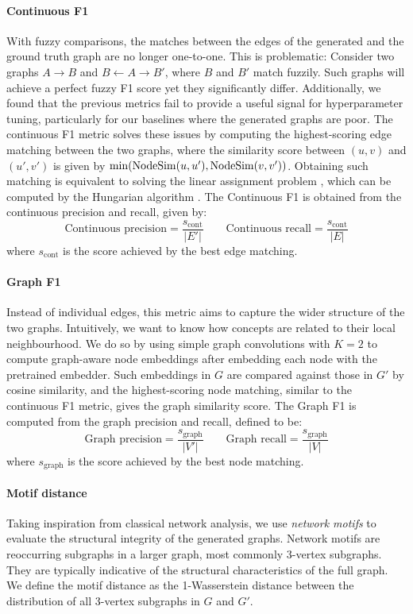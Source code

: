 \paragraph{Continuous F1}
With fuzzy comparisons, the matches between the edges of the generated and the ground truth graph are no longer one-to-one. This is problematic: Consider two graphs $A \rightarrow B$ and $B \leftarrow A \rightarrow B'$, where $B$ and $B'$ match fuzzily. Such graphs will achieve a perfect fuzzy F1 score yet they significantly differ. Additionally, we found that the previous metrics fail to provide a useful signal for hyperparameter tuning, particularly for our baselines where the generated graphs are poor. The continuous F1 metric solves these issues by computing the highest-scoring edge matching between the two graphs, where the similarity score between $(u, v)$ and $(u', v')$ is given by $\min(\operatorname{NodeSim}(u, u'), \operatorname{NodeSim}(v, v'))$. Obtaining such matching is equivalent to solving the linear assignment problem \cite{martello1987linear}, which can be computed by the Hungarian algorithm \cite{kuhn1955hungarian}. The Continuous F1 is obtained from the continuous precision and recall, given by:
\[
    \text{Continuous precision} = \frac{s_\text{cont}}{|E'|} \qquad
    \text{Continuous recall} = \frac{s_\text{cont}}{|E|}
\]
where $s_\text{cont}$ is the score achieved by the best edge matching.

\paragraph{Graph F1}
Instead of individual edges, this metric aims to capture the wider structure of the two graphs. Intuitively, we want to know how concepts are related to their local neighbourhood. We do so by using simple graph convolutions \cite{wu2019simplifying} with $K=2$ to compute graph-aware node embeddings after embedding each node with the pretrained embedder. Such embeddings in $G$ are compared against those in $G'$ by cosine similarity, and the highest-scoring node matching, similar to the continuous F1 metric, gives the graph similarity score. The Graph F1 is computed from the graph precision and recall, defined to be:
\[
    \text{Graph precision} = \frac{s_\text{graph}}{|V'|} \qquad
    \text{Graph recall} = \frac{s_\text{graph}}{|V|}
\]
where $s_\text{graph}$ is the score achieved by the best node matching.

\paragraph{Motif distance}
Taking inspiration from classical network analysis, we use \emph{network motifs} \cite{milo2002network,shen2002network} to evaluate the structural integrity of the generated graphs. Network motifs are reoccurring subgraphs in a larger graph, most commonly 3-vertex subgraphs. They are typically indicative of the structural characteristics of the full graph. We define the motif distance as the 1-Wasserstein distance between the distribution of all 3-vertex subgraphs in $G$ and $G'$.

